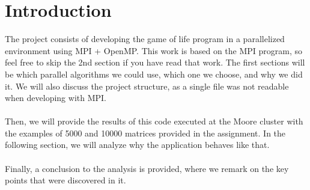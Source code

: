 \documentclass[11pt, a4paper]{article}
\begin{document}
	\section{Introduction}
	
	The project consists of developing the game of life program in a parallelized environment using MPI + OpenMP. This work is based on the MPI program, so feel free to skip the 2nd section if you have read that work. The first sections will be which parallel algorithms we could use, which one we choose, and why we did it. We will also discuss the project structure, as a single file was not readable when developing with MPI. \\
	\\
	Then, we will provide the results of this code executed at the Moore cluster with the examples of 5000 and 10000 matrices provided in the assignment. In the following section, we will analyze why the application behaves like that.\\
	\\
	Finally, a conclusion to the analysis is provided, where we remark on the key points that were discovered in it.
\end{document}
